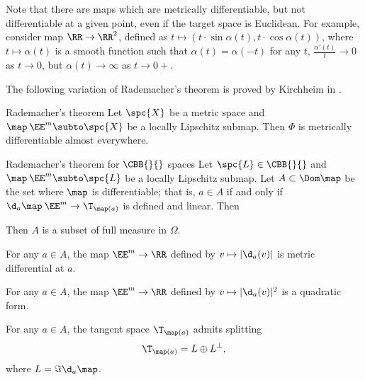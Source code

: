 Note that there are maps which are metrically differentiable,
but not differentiable at a given point,
even if the target space is Euclidean.
For example, consider map $\RR\to\RR^2$,
defined as $t\mapsto (t\cdot\sin\alpha(t), t\cdot\cos\alpha(t))$,
where $t\mapsto \alpha(t)$ is a smooth function such that 
$\alpha(t)=\alpha(-t)$ for any $t$,
$\tfrac{\alpha'(t)}t\to 0$ as $t\to 0$, 
but $\alpha(t)\to \infty$ as $t\to 0+$.

The following variation of Rademacher's theorem 
is proved by Kirchheim in \cite{kirchheim}.

\begin{thm}{Rademacher's theorem}\label{thm:rademacher}
Let $\spc{X}$ be a metric space 
and $\map\:\EE^m\subto\spc{X}$ be a locally Lipschitz submap.
Then $\Phi$ is metrically differentiable almost everywhere.
\end{thm}


\qeds

\begin{thm}{Rademacher's theorem for $\CBB{}{}$ spaces}
Let $\spc{L}\in\CBB{}{}$  
and $\map\:\EE^m\subto\spc{L}$ be a locally Lipschitz submap.
Let $A\subset \Dom \map$ be the set where $\map$ is differentiable;
that is, $a\in A$ if and only if $\d_a\map\:\EE^m\to\T_{\map(a)}$ is defined and linear.
Then 
\begin{subthm}{}
Then $A$ is a subset of full measure in $\Omega$.
\end{subthm}

\begin{subthm}{}
For any $a\in A$,
the map $\EE^m\to\RR$ defined by $v\mapsto |\d_a(v)|$ is metric differential at $a$.
\end{subthm}

\begin{subthm}{}
For any $a\in A$,
the map $\EE^m\to\RR$ defined by $v\mapsto |\d_a(v)|^2$ is a quadratic form.
\end{subthm}

\begin{subthm}{}
For any $a\in A$, the tangent space
$\T_{\map(a)}$ admits splitting
\[\T_{\map(a)}=L\oplus L^\bot,\]
where $L=\Im\d_a\map$.
\end{subthm}
\end{thm}

